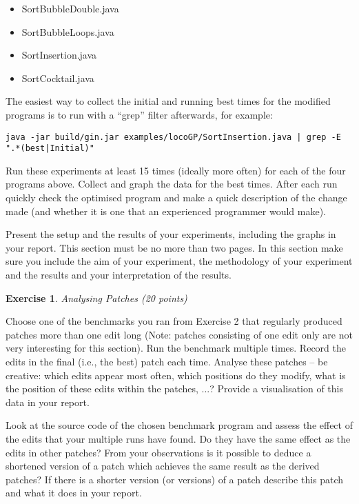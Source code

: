 \documentclass{pracs}
\newtheorem{exercise}{Exercise}
\begin{document}
\begin{itemize}
\item SortBubbleDouble.java
\item SortBubbleLoops.java
\item SortInsertion.java
\item SortCocktail.java
\end{itemize}

The easiest way to collect the initial and running best times for the modified programs is to run with a “grep” filter afterwards, for example:

{\small{\verb+java -jar build/gin.jar examples/locoGP/SortInsertion.java | grep -E ".*(best|Initial)"+}}

Run these experiments at least 15 times (ideally more often) for each of the four programs above. Collect and graph the data for the best times. After each run quickly check the optimised program and make a quick description of the change made (and whether it is one that an experienced programmer would make). 

Present the setup and the results of your experiments, including the graphs in your report. This section must be no more than two pages. In this section make sure you include the aim of your experiment, the methodology of your experiment and the results and your interpretation of the results.






\begin{exercise}
Analysing Patches (20 points)
\end{exercise}

Choose one of the benchmarks you ran from Exercise 2 that regularly produced patches more than one edit long (Note: patches consisting of one edit only are not very interesting for this section). Run the benchmark multiple times. Record the edits in the final (i.e., the best) patch each time. Analyse these patches -- be creative: which edits appear most often, which positions do they modify, what is the position of these edits within the patches, ...? Provide a visualisation of this data in your report. 

Look at the source code of the chosen benchmark program and assess the effect of the edits that your multiple runs have found. Do they have the same effect as the edits in other patches? From your observations is it possible to deduce a shortened version of a patch which achieves the same result as the derived patches? If there is a shorter version (or versions) of a patch describe this patch and what it does in your report.
\end{document}
